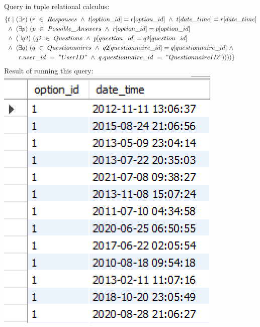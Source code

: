 \documentclass[12pt, oneside]{article}
\begin{document}
    \bigskip
    \noindent \noindent \noindent Query in tuple relational calculus: 
    \begin{align*}
        \{t\ |\ (&\exists r)\ (r\ \in\ Responses\ \wedge\ t[option\_id] = r[option\_id]\ \wedge\ t[date\_time] = r[date\_time]\\
        \newline\wedge\ (&\exists p)\ (p\ \in\ Possible\_Answers\ \wedge\ r[option\_id]=p[option\_id]\\
        \newline\wedge\ (&\exists q2)\ (q2\ \in\ Questions\ \wedge\ p[question\_id] = q2[question\_id]\\
        \newline\wedge\ (&\exists q)\ (q\ \in\ Questionnaires\ \wedge\ q2[questionnaire\_id] = q[questionnaire\_id]\ \wedge\ \\
        &r.user\_id\ =\ "UserID"\ \wedge\ q.questionnaire\_id\ =\ "QuestionnaireID"))))\}
    \end{align*}
    \noindent Result of running this query:\\
    \includegraphics{query3result.PNG}
\end{document}
